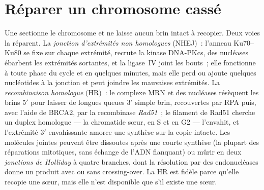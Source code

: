 \section{Réparer un chromosome cassé}

\begin{definition}\label{def:b3:dna-repair:dsb}
Une \emph{} sectionne le chromosome et ne laisse
aucun brin intact à recopier. Deux voies la réparent. La \emph{jonction
d'extrémités non homologues} (NHEJ)~: l'anneau Ku70--Ku80 se fixe sur
chaque extrémité, recrute la kinase DNA-PKcs, des nucléases ébarbent
les extrémités sortantes, et la ligase~IV joint les bouts~; elle
fonctionne à toute phase du cycle et en quelques minutes, mais elle
perd ou ajoute quelques nucléotides à la jonction et peut joindre les
mauvaises extrémités. La \emph{recombinaison homologue} (HR)~: le
complexe MRN et des nucléases résèquent les brins 5$'$ pour laisser de
longues queues 3$'$ simple brin, recouvertes par RPA puis, avec l'aide
de BRCA2, par la recombinase \emph{Rad51}~; le filament de Rad51
cherche un duplex homologue --- la chromatide sœur, en S et en G2 ---
l'envahit, et l'extrémité 3$'$ envahissante amorce une synthèse sur la
copie intacte. Les molécules jointes peuvent être dissoutes après une
courte synthèse (la plupart des réparations mitotiques, sans échange de
l'ADN flanquant) ou mûrir en deux \emph{jonctions de Holliday} à quatre
branches, dont la résolution par des endonucléases donne un produit
avec ou sans crossing-over. La HR est fidèle parce qu'elle recopie une
sœur, mais elle n'est disponible que s'il existe une sœur.
\end{definition}

